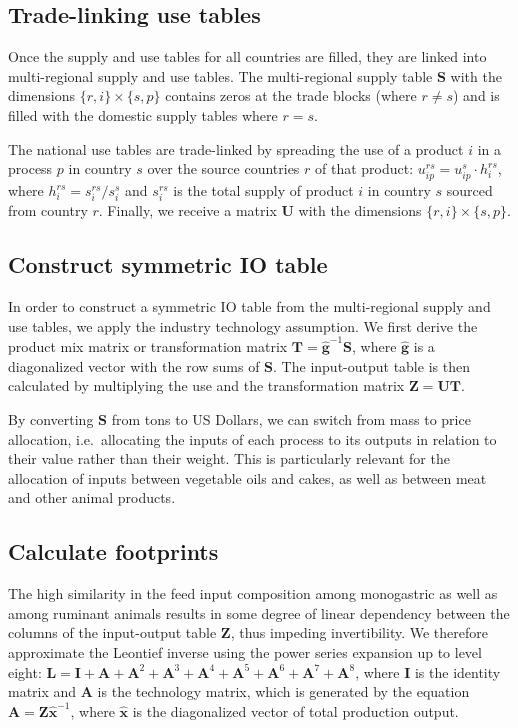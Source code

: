 \documentclass[]{article}
\begin{document}
\subsection{Trade-linking use tables}\label{trade-linking-use-tables}

Once the supply and use tables for all countries are filled, they are
linked into multi-regional supply and use tables. The multi-regional
supply table \(\mathbf{S}\) with the dimensions
\(\{r,i\} \times \{s,p\}\) contains zeros at the trade blocks (where
\(r \neq s\)) and is filled with the domestic supply tables where
\(r = s\).

The national use tables are trade-linked by spreading the use of a
product \(i\) in a process \(p\) in country \(s\) over the source
countries \(r\) of that product:
\(u_{ip}^{rs} = u_{ip}^{s} \cdot h_{i}^{rs}\), where
\(h_{i}^{rs} = s_{i}^{rs}/s_{i}^{s}\) and \(s_{i}^{rs}\) is the total
supply of product \(i\) in country \(s\) sourced from country \(r\).
Finally, we receive a matrix \(\mathbf{U}\) with the dimensions
\(\{r,i\} \times \{s,p\}\).

\subsection{Construct symmetric IO
table}\label{construct-symmetric-io-table}

In order to construct a symmetric IO table from the multi-regional
supply and use tables, we apply the industry technology assumption. We
first derive the product mix matrix or transformation matrix
\(\mathbf{T}=\mathbf{\hat{g}}^{-1}\mathbf{S}\), where
\(\mathbf{\hat{g}}\) is a diagonalized vector with the row sums of
\(\mathbf{S}\). The input-output table is then calculated by multiplying
the use and the transformation matrix
\(\mathbf{Z} = \mathbf{U} \mathbf{T}\).

By converting \(\mathbf{S}\) from tons to US Dollars, we can switch from
mass to price allocation, i.e.~allocating the inputs of each process to
its outputs in relation to their value rather than their weight. This is
particularly relevant for the allocation of inputs between vegetable
oils and cakes, as well as between meat and other animal products.

\subsection{Calculate footprints}\label{calculate-footprints}

The high similarity in the feed input composition among monogastric as
well as among ruminant animals results in some degree of linear
dependency between the columns of the input-output table \(\mathbf{Z}\),
thus impeding invertibility. We therefore approximate the Leontief
inverse using the power series expansion up to level eight:
\(\mathbf{L} = \mathbf{I}+\mathbf{A}+\mathbf{A}^2+\mathbf{A}^3+\mathbf{A}^4+\mathbf{A}^5+\mathbf{A}^6+\mathbf{A}^7+\mathbf{A}^8\),
where \(\mathbf{I}\) is the identity matrix and \(\mathbf{A}\) is the
technology matrix, which is generated by the equation
\(\mathbf{A}=\mathbf{Z}\mathbf{\hat{x}}^{-1}\), where
\(\mathbf{\hat{x}}\) is the diagonalized vector of total production
output.
\end{document}

